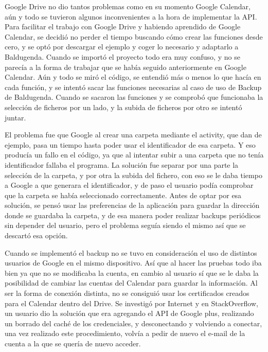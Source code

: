Google Drive no dio tantos problemas como en su momento Google Calendar, aún y todo se tuvieron algunos inconvenientes a la hora de implementar la API.
Para facilitar el trabajo con Google Drive y habiendo aprendido de Google Calendar, se decidió no perder el tiempo buscando cómo crear las funciones desde cero, y se optó por descargar el ejemplo y coger lo necesario y adaptarlo a Baldugenda.
Cuando se importó el proyecto todo era muy confuso, y no se parecía a la forma de trabajar que se había seguido anteriormente en Google Calendar.
Aún y todo se miró el código, se entendió más o menos lo que hacía en cada función, y se intentó sacar las funciones necesarias al caso de uso de Backup de Baldugenda.
Cuando se sacaron las funciones y se comprobó que funcionaba la selección de ficheros por un lado, y la subida de ficheros por otro se intentó juntar.

El problema fue que Google al crear una carpeta mediante el \gls{activity}, que dan de ejemplo, pasa un tiempo hasta poder usar el identificador de esa carpeta. Y eso producía un fallo en el código, ya que al intentar subir a una carpeta que no tenía identificador fallaba el programa.
La solución fue separar por una parte la selección de la carpeta, y por otra la subida del fichero, con eso se le daba tiempo a Google a que generara el identificador, y de paso el usuario podía comprobar que la carpeta se había seleccionado correctamente.
Antes de optar por esa solución, se pensó usar las preferencias de la aplicación para guardar la dirección donde se guardaba la carpeta, y de esa manera poder realizar backups periódicos sin depender del usuario, pero el problema seguía siendo el mismo así que se descartó esa opción.

Cuando se implementó el backup no se tuvo en consideración el uso de distintos usuarios de Google en el mismo dispositivo. Así que al hacer las pruebas todo iba bien ya que no se modificaba la cuenta, en cambio al usuario sí que se le daba la posibilidad de cambiar las cuentas del Calendar para guardar la información. Al ser la forma de conexión distinta, no se consiguió usar los certificados creados para el Calendar dentro del Drive.
Se investigó por Internet y en StackOverflow, un usuario dio la solución que era agregando el API de Google plus, realizando un borrado del caché de los credenciales, y desconectando y volviendo a conectar, una vez realizado este procedimiento, volvía a pedir de nuevo el e-mail de la cuenta a la que se quería de nuevo acceder.

